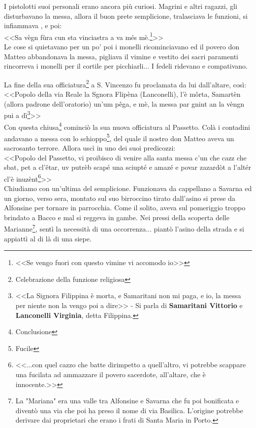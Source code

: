 I pistolotti suoi personali erano ancora più curiosi. Magrini e altri ragazzi, gli disturbavano la messa, allora il buon prete semplicione, tralasciava le funzioni, si infiammava , e poi:\\
\indent <<Sa vègn fùra cun sta vinciastra a va més mè.\footnote{<<Se vengo fuori con questo vimine vi accomodo io>>}>>\\
\indent Le cose si quietavano per un po' poi i monelli ricominciavano ed il povero don Matteo abbandonava la messa, pigliava il vimine e vestito dei sacri paramenti rincorreva i monelli per il cortile per picchiarli... I fedeli ridevano e compativano. 

La fine della sua officiatura\footnote{Celebrazione della funzione religiosa} a S. Vincenzo fu proclamata da lui dall'altare, così:\\
\indent <<Popolo della via Reale la Sgnora Flipèna (Lanconelli), l'è môrta, Samartèn (allora padrone dell'oratorio) un'um pêga, e mè, la messa par gnint an la vèngn pui a dì\footnote{<<La Signora Filippina è morta, e Samaritani non mi paga, e io, la messa per niente non la vengo poi a dire>> - Si parla di \textbf{Samaritani Vittorio} e \textbf{Lanconelli Virginia}, detta Filippina.}>>\\
Con questa chiusa\footnote{Conclusione} cominciò la sua nuova officiatura al Passetto. Colà i contadini andavano a messa con lo schioppo\footnote{Fucile}, del quale il nostro don Matteo aveva un sacrosanto terrore. Allora uscì in uno dei suoi predicozzi:\\
\indent <<Popolo del Passetto, vi proibisco di venire alla santa messa c'un che cazz che sbat, pet a cl'êtar, uv putrèb scapé una sciupté e amazé e povar zazardòt a l'altér cl'è inuzènt\footnote{<<...con quel cazzo che batte dirimpetto a quell'altro, vi potrebbe scappare una fucilata ad ammazzare il povero sacerdote, all'altare, che è innocente.>>}>>\\

Chiudiamo con un'ultima del semplicione. Funzionava da cappellano a Savarna ed un giorno, verso sera, montato sul suo birroccino tirato dall'asino si prese da Alfonsine per tornare in parrocchia. Come il solito, aveva sul pomeriggio troppo brindato a Bacco e mal si reggeva in gambe. Nei pressi della scoperta delle Marianne\footnote{La "Mariana" era una valle tra Alfonsine e Savarna che fu poi bonificata e diventò una via che poi ha preso il nome di via Basilica. L'origine potrebbe derivare dai proprietari che erano i frati di Santa Maria in Porto.}, sentì la necessità di una occorrenza... piantò l'asino della strada e si appiattì al di là di una siepe.

